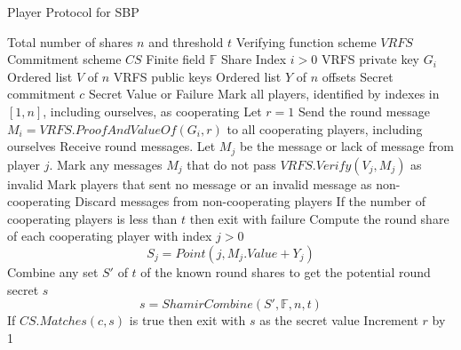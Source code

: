 \documentclass{dalcsthesis}
\begin{document}
\begin{algorithm}
  \caption{Player Protocol for SBP}
  \label{alg:SBP:Player}
  \begin{algorithmic}[1]
    \INPUT Total number of shares $n$ and threshold $t$
    \INPUT Verifying function scheme $VRFS$
    \INPUT Commitment scheme $CS$
    \INPUT Finite field $\mathbb{F}$
    \INPUT Share Index $i > 0$
    \INPUT VRFS private key $G_i$
    \INPUT Ordered list $V$ of $n$ VRFS public keys
    \INPUT Ordered list $Y$ of $n$ offsets
    \INPUT Secret commitment $c$
    \OUTPUT Secret Value or Failure
    \STATE Mark all players, identified by indexes in $[1, n]$, including ourselves, as cooperating
    \STATE Let $r = 1$
      \STATE Send the round message $M_i = VRFS.ProofAndValueOf(G_i, r)$ to all cooperating players, including ourselves
      \STATE Receive round messages. Let $M_j$ be the message or lack of message from player $j$.
      \STATE Mark any messages $M_j$ that do not pass $VRFS.Verify(V_j, M_j)$ as invalid
      \STATE Mark players that sent no message or an invalid message as non-cooperating
      \STATE Discard messages from non-cooperating players
      \STATE If the number of cooperating players is less than $t$ then exit with failure
      \STATE Compute the round share of each cooperating player with index $j > 0$
			$$S_j = Point(j, M_j.Value + Y_j)$$
      \STATE Combine any set $S'$ of $t$ of the known round shares to get the potential round secret $s$
      		$$s = ShamirCombine(S', \mathbb{F}, n, t)$$
      \STATE If $CS.Matches(c, s)$ is true then exit with $s$ as the secret value
      \STATE Increment $r$ by 1
    \ENDWHILE
  \end{algorithmic}
\end{algorithm}
\end{document}
